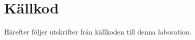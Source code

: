 \documentclass[a4paper, 12pt]{article}
\begin{document}
\newpage
\appendix
{}
\section{Källkod}
Härefter följer utskrifter från källkoden till denna laboration.

% 
\end{document}
